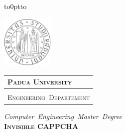 \documentclass[a4paper, 12pt, twoside, openright]{book}
\begin{document}
\frontmatter

\begin{titlepage} %
\begin{center}
\vbox to0pt{\vbox to\vss}

\hspace{0.5cm}
\begin{minipage}{.20\textwidth}
  \includegraphics[height=2.5cm]{./images/unipd-bn}
\end{minipage}\begin{minipage}{.90\textwidth}
  \begin{table}[H]
  \begin{tabular}{l}
  \scshape{\Large{\bfseries{Padua University}}} \\
  \hline \\
  \scshape{\Large{Engineering~Departement}} \\
  \end{tabular}
  \end{table}
\end{minipage}

\vspace{1cm}
\emph{\Large{Computer~Engineering~Master~Degree}} \\
\vspace{1.5cm}
\scshape{\Large{\bfseries{Invisible CAPPCHA}}} \\
\vspace{0.2cm} \linespread{1} \scshape{\large{\bfseries{}}}
\end{center}


\end{titlepage}
\end{document}
